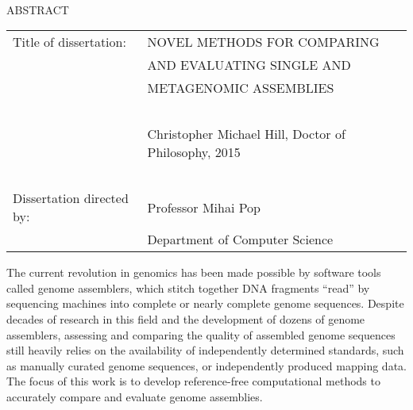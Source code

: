 
\hbox{\ }

\renewcommand{\baselinestretch}{1}
\small \normalsize

\begin{center}
\large{{ABSTRACT}}

\vspace{3em}

\end{center}
\hspace{-.15in}
\begin{tabular}{ll}
Title of dissertation:    & {\large  NOVEL METHODS FOR COMPARING}\\
&				      {\large AND EVALUATING SINGLE AND  } \\
&                     {\large METAGENOMIC ASSEMBLIES} \\
\ \\
&                          {\large  Christopher Michael Hill, Doctor of Philosophy, 2015} \\
\ \\
Dissertation directed by: & {\large  Professor Mihai Pop} \\
&  				{\large	 Department of Computer Science } \\
\end{tabular}

\vspace{3em}

\renewcommand{\baselinestretch}{2}
\large \normalsize


The current revolution in genomics has been made possible by software tools called genome assemblers, which stitch together DNA fragments ``read'' by sequencing machines into complete or nearly complete genome sequences. Despite decades of research in this field and the development of dozens of genome assemblers, assessing and comparing the quality of assembled genome sequences still heavily relies on the availability of independently determined standards, such as manually curated genome sequences, or independently produced mapping data. The focus of this work is to develop reference-free computational methods to accurately compare and evaluate genome assemblies.

